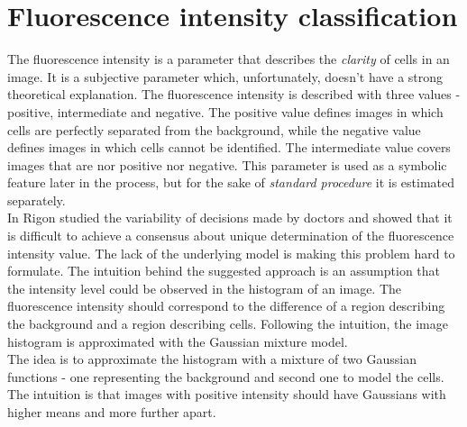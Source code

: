 
\chapter{Fluorescence intensity classification} %

\label{Chapter5} %



The fluorescence intensity is a parameter that describes the \textit{clarity} of cells in an image. It is a subjective parameter which, unfortunately, doesn't have a strong theoretical explanation. The fluorescence intensity is described with three values - positive, intermediate and negative. The positive value defines images in which cells are perfectly separated from the background, while the negative value defines images in which cells  cannot be identified. The intermediate value covers images that are nor positive nor negative. This parameter is used as a symbolic feature later in the process, but for the sake of \textit{standard procedure} it is estimated separately. \\


In \cite{Rigon2007} Rigon studied the variability of decisions made by doctors and showed that it is difficult to achieve a consensus about unique determination of the fluorescence intensity value. The lack of the underlying model is making this problem hard to formulate. The intuition behind the suggested approach is an assumption that the intensity level could be observed in the histogram of an image. The fluorescence intensity should correspond to the difference of a region describing the background and a region describing cells. Following the intuition, the image histogram is approximated with the Gaussian mixture model. \\

The idea is to approximate the histogram with a mixture of two Gaussian functions - one representing the background and second one to model the cells. The intuition is that images with positive intensity should have Gaussians with higher means and more further apart. 



